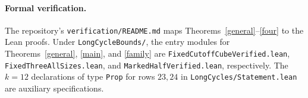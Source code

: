 \paragraph{Formal verification.}
\begingroup\raggedright
The repository's \texttt{verification/README.md} maps Theorems~\ref{general}--\ref{four} to the Lean proofs. Under \texttt{LongCycleBounds/}, the entry modules for Theorems~\ref{general}, \ref{main}, and \ref{family} are \texttt{FixedCutoffCubeVerified.lean}, \texttt{FixedThreeAllSizes.lean}, and \texttt{MarkedHalfVerified.lean}, respectively. The \(k=12\) declarations of type \texttt{Prop} for rows \(23,24\) in \texttt{LongCycles/Statement.lean} are auxiliary specifications.
\par\endgroup
